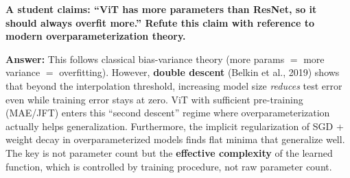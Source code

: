 \begin{examq}
\textbf{A student claims: ``ViT has more parameters than ResNet, so it should always overfit more.'' Refute this claim with reference to modern overparameterization theory.}

\textbf{Answer:} This follows classical bias-variance theory (more params $=$ more variance $=$ overfitting). However, \textbf{double descent} (Belkin et al., 2019) shows that beyond the interpolation threshold, increasing model size \emph{reduces} test error even while training error stays at zero. ViT with sufficient pre-training (MAE/JFT) enters this ``second descent'' regime where overparameterization actually helps generalization. Furthermore, the implicit regularization of SGD + weight decay in overparameterized models finds flat minima that generalize well. The key is not parameter count but the \textbf{effective complexity} of the learned function, which is controlled by training procedure, not raw parameter count.
\end{examq}
